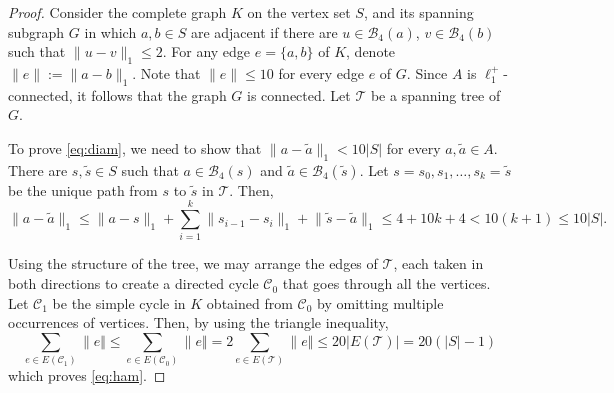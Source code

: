 \documentclass[11pt, reqno]{amsart}
\numberwithin{equation}{section}
\begin{document}
\begin{proof}
Consider the complete graph $K$ on the vertex set $S$, and its spanning subgraph $G$ in which $a,b\in S$ are adjacent if there are $u \in {\mathcal B}_4(a)$, $v\in{\mathcal B}_4(b)$ such that $\lVert u-v\rVert_1\leq 2$.
For any edge $e=\{a,b\}$ of $K$, denote $\lVert e\rVert:=\lVert a-b\rVert_1$.
Note that $\lVert e\rVert\leq 10$ for every edge $e$ of $G$.
Since $A$ is $\ell_1^+$-connected, it follows that the graph $G$ is connected.
Let $\mathcal T$ be a spanning tree of $G$.

To prove \eqref{eq:diam}, we need to show that $\lVert a-\tilde{a}\rVert_1<10\lvert S\rvert$ for every $a,\tilde{a}\in A$. There are $s,\tilde{s}\in S$ such that $a\in{\mathcal B}_4(s)$ and $\tilde{a}\in{\mathcal B}_4(\tilde{s})$. Let $s=s_0,s_1,\ldots,s_k=\tilde{s}$ be the unique path from $s$ to $\tilde{s}$ in $\mathcal T$. Then,
$$\lVert a-\tilde{a}\rVert_1\leq \lVert a-s\rVert_1+\sum_{i=1}^k\lVert s_{i-1}-s_i\rVert_1+\lVert \tilde{s}-\tilde{a}\rVert_1\leq 4+10k+4<10(k+1)\leq 10\lvert S\rvert.$$

Using the structure of the tree, we may arrange the edges of $\mathcal T$, each taken in both directions to create a directed cycle ${\mathcal C}_0$ that goes through all the vertices. Let ${\mathcal C}_1$ be the simple cycle in $K$ obtained from ${\mathcal C}_0$ by omitting multiple occurrences of vertices.
Then, by using the triangle inequality,
$$
\sum_{e\in E({\mathcal C}_1)}\lVert e \Vert\leq
\sum_{e\in E({\mathcal C}_0)}\lVert e \Vert=2\sum_{e\in E({\mathcal T})}\lVert e \Vert\leq 20\lvert E(\mathcal T)\rvert=20(\lvert S\rvert-1)$$
which proves \eqref{eq:ham}.


\end{proof}
\end{document}
